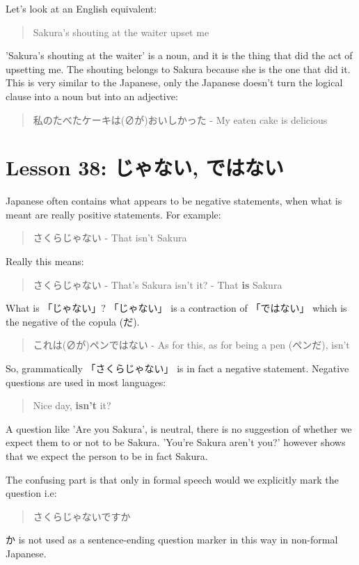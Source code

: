 \documentclass[11pt]{article}
\begin{document}
Let's look at an English equivalent:
\begin{quote}
Sakura's shouting at the waiter upset me
\end{quote}
'Sakura's shouting at the waiter' is a noun, and it is the thing that did the act of upsetting me. The shouting belongs to Sakura because she is the one that did it. This is very similar to the Japanese, only the Japanese doesn't turn the logical clause into a noun but into an adjective:
\begin{quote}
私のたべたケーキは(∅が)おいしかった - My eaten cake is delicious
\end{quote}

\section{Lesson 38: じゃない, ではない}
\label{sec:org7ce21cf}
Japanese often contains what appears to be negative statements, when what is meant are really positive statements. For example:
\begin{quote}
さくらじゃない - That isn't Sakura
\end{quote}
Really this means:
\begin{quote}
さくらじゃない - That's Sakura isn't it? - That \textbf{is} Sakura
\end{quote}

What is 「じゃない」?  「じゃない」 is a contraction of 「ではない」 which is the negative of the copula (だ).
\begin{quote}
これは(∅が)ペンではない - As for this, as for being a pen (ペンだ), isn't
\end{quote}

So, grammatically 「さくらじゃない」 is in fact a negative statement. Negative questions are used in most languages:
\begin{quote}
Nice day, \textbf{isn't} it?
\end{quote}

A question like 'Are you Sakura', is neutral, there is no suggestion of whether we expect them to or not to be Sakura. 'You're Sakura aren't you?' however shows that we expect the person to be in fact Sakura.

The confusing part is that only in formal speech would we explicitly mark the question i.e:
\begin{quote}
さくらじゃないですか
\end{quote}
か is not used as a sentence-ending question marker in this way in non-formal Japanese.
\end{document}
